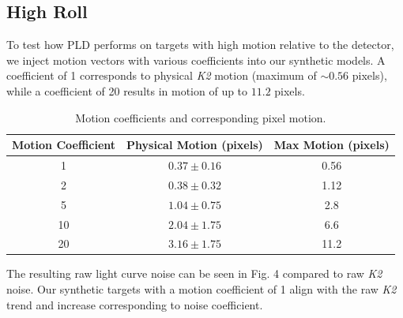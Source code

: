 \documentclass[12pt,preprint]{aastex}
\begin{document}
\subsection{High Roll}

To test how PLD performs on targets with high motion relative to the detector, we inject motion vectors with various coefficients into our synthetic models. A coefficient of 1 corresponds to physical \textit{K2} motion (maximum of $\sim 0.56$ pixels), while a coefficient of 20 results in motion of up to $11.2$ pixels.

\begin{table}[h!]
\begin{center}
    \begin{tabular}{c | c | c}
        Motion Coefficient & Physical Motion (pixels) & Max Motion (pixels) \\
        \hline \hline
        1 & $0.37\pm0.16$ & 0.56 \\
        2 & $0.38\pm0.32$ & 1.12 \\
				5 & $1.04\pm0.75$ & 2.8 \\
				10 & $2.04\pm1.75$ & 6.6 \\
				20 & $3.16\pm1.75$ & 11.2 \\
   \end{tabular}
	 \caption{Motion coefficients and corresponding pixel motion.}
	 \label{table:1}
\end{center}
\end{table}

The resulting raw light curve noise can be seen in Fig. 4 compared to raw \textit{K2} noise. Our synthetic targets with a motion coefficient of 1 align with the raw \textit{K2} trend and increase corresponding to noise coefficient.
\end{document}
